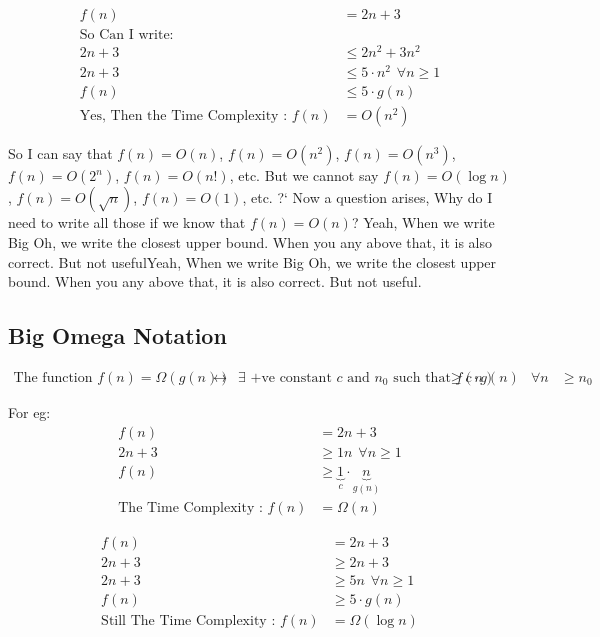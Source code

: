 \documentclass{article}
\begin{document}
\[
\begin{aligned}
    f(n) &= 2n + 3 \\
    \text{So Can I write: }\\
        2n+3 &\leq 2n^2 + 3n^2\\ 
        2n+3 &\leq 5\cdot n^2 \hspace{5pt} \forall n \geq 1 \\
        f(n) &\leq 5 \cdot g(n) \\
        \text{Yes, Then the Time Complexity : } f(n) &= O(n^2)
\end{aligned}
\]

So I can say that $f(n) = O(n)$, $f(n) = O(n^2)$, $f(n) = O(n^3)$, $f(n) = O(2^n)$, $f(n) = O(n!)$, etc.
But we cannot say $f(n) = O(\log{n})$, $f(n) = O(\sqrt{n})$, $f(n) = O(1)$, etc.
\newline
\newline
?` Now a question arises, Why do I need to write all those if we know that $f(n) = O(n)$? 
Yeah, When we write Big Oh, we write the closest upper bound. When you any above that, it is also correct. But not usefulYeah, When we write Big Oh, we write the closest upper bound. When you any above that, it is also correct. But not useful.

\subsection{Big Omega Notation}
\[
\begin{aligned}
        \text{The function } f(n) = \Omega{(g(n))} &\leftrightarrow &\exists \text{ +ve constant $c$ and } 
        n_0 \text{ such that } f{(n)} &\geq c \cdot g{(n)} &\forall n &\geq n_0
\end{aligned}
\]

For eg:
\[
\begin{aligned}
        f(n) &= 2n + 3 \\
        2n+3 &\geq 1n \hspace{5pt} \forall n \geq 1 \\
        f(n) &\geq \underbrace{1}_c \cdot \underbrace{n}_{g(n)}\\
        \text{The Time Complexity : } f(n) &= \Omega(n)
\end{aligned}
\]

\[
\begin{aligned}
        f(n) &= 2n + 3 \\
        2n+3 &\geq 2n + 3 \\
        2n+3 &\geq 5n \hspace{5pt} \forall n \geq 1 \\
        f(n) &\geq 5 \cdot g(n) \\
        \text{Still The Time Complexity : } f(n) &= \Omega(\log{n})
\end{aligned}
\]
\end{document}
